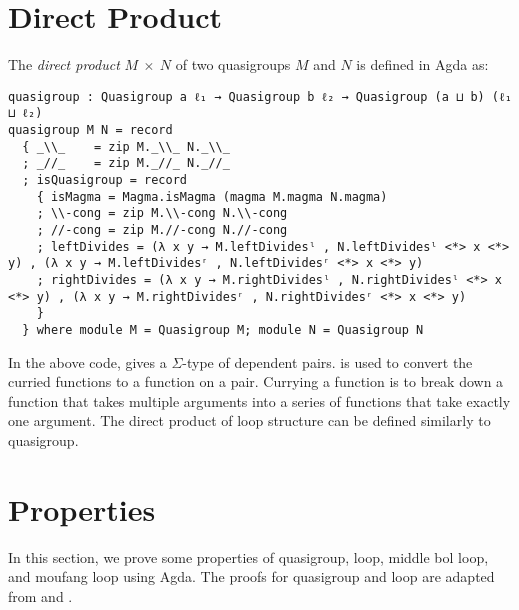 \section{Direct Product}
The \textit{direct product} $M \ \times \ N$ of two quasigroups $M$ and $N$ is
defined in Agda as:

\begin{verbatim}
quasigroup : Quasigroup a ℓ₁ → Quasigroup b ℓ₂ → Quasigroup (a ⊔ b) (ℓ₁ ⊔ ℓ₂)
quasigroup M N = record
  { _\\_    = zip M._\\_ N._\\_
  ; _//_    = zip M._//_ N._//_
  ; isQuasigroup = record
    { isMagma = Magma.isMagma (magma M.magma N.magma)
    ; \\-cong = zip M.\\-cong N.\\-cong
    ; //-cong = zip M.//-cong N.//-cong
    ; leftDivides = (λ x y → M.leftDividesˡ , N.leftDividesˡ <*> x <*> y) , (λ x y → M.leftDividesʳ , N.leftDividesʳ <*> x <*> y)
    ; rightDivides = (λ x y → M.rightDividesˡ , N.rightDividesˡ <*> x <*> y) , (λ x y → M.rightDividesʳ , N.rightDividesʳ <*> x <*> y)
    }
  } where module M = Quasigroup M; module N = Quasigroup N
\end{verbatim}

In the above code,  gives a $\Sigma$-type of dependent pairs.
\inline{<*>} is used to convert the curried functions to a function on a pair.
Currying a function is to break down a function that takes multiple arguments
into a series of functions that take exactly one argument. The direct product of
loop structure can be defined similarly to quasigroup. 

\section{Properties}
In this section, we prove some properties of quasigroup, loop, middle bol loop,
and moufang loop using Agda. The proofs for quasigroup and loop are adapted from
\cite{Stener2016MoufangL} and \cite{bruck1944some}.
